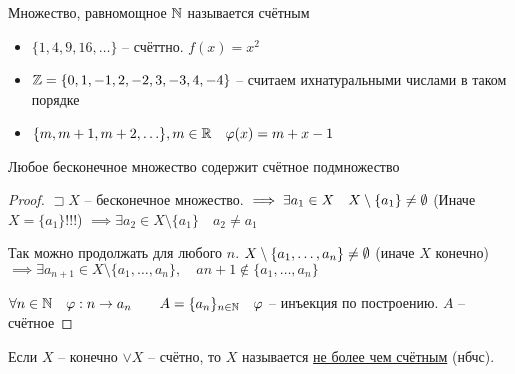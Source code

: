     \begin{definition}
        Множество, равномощное $\mathbb{N} $ называется счётным
    \end{definition}
    \begin{example}
        \begin{itemize}
            \item $\{1, 4, 9, 16, \ldots\}$ -- счёттно. $f(x) = x^2$
            \item $\mathbb{Z}  = \{0,1,-1,2,-2,3,-3,4,-4\}$ -- считаем ихнатуральными числами  в таком порядке
            \item $\{m, m+1, m+2, \ldots\}, m\in \mathbb{R}\quad \varphi(x) = m+x-1$
        \end{itemize}
    \end{example}
    \begin{theorem}
        Любое бесконечное множество содержит счётное подмножество
    \end{theorem}
    \begin{proof}
        $\sqsupset X$ -- бесконечное множество. $\implies  \exists a_1\in X\quad X\setminus \{a_1   \}\neq \emptyset $ (Иначе $X = \{a_1\}$!!!) $\implies \exists a_2\in X\setminus \{a_1\}\quad a_2\neq a_1$

        Так можно продолжать для любого $n$. $X\setminus \{a_1, \ldots, a_n\}\neq \emptyset $ (иначе $X$ конечно) $\implies \exists a_{n+1}\in X\setminus \{a_1, \ldots, a_n\}, \quad a{n+1}\not\in \{a_1, \ldots, a_n\}$

        $\forall n\in \mathbb{N} \quad \varphi: n\to a_n\qquad A = \{a_n\}_{n\in \mathbb{N} }\quad \varphi$ -- инъекция по построению. $A$ -- счётное
    \end{proof}

    \begin{definition}
        Если $X$ -- конечно $\vee X$ -- счётно, то $X$ называется \underline{не более чем счётным} (нбчс).
    \end{definition} 

